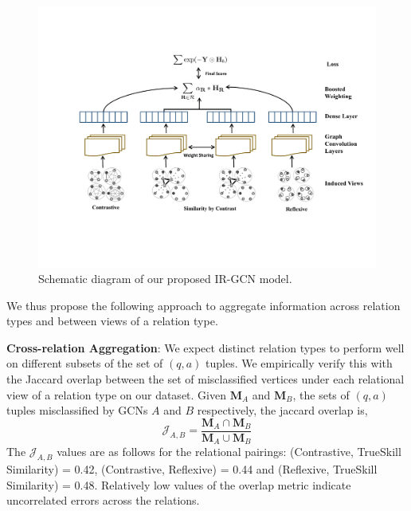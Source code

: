 \begin{figure}
    \centering
    \includegraphics[scale=0.48]{figures/Architecture_new.pdf}
    \caption{\small \label{fig:adaboost} Schematic diagram of our proposed IR-GCN model.} %
    \vspace{-0.1in}
\end{figure}


We thus propose the following approach to aggregate information across relation types and between views of a relation type.

\noindent
\textbf{Cross-relation Aggregation}: We expect distinct relation types to perform well on different subsets of the set of $(q,a)$ tuples. We empirically verify this with the Jaccard overlap between the set of misclassified vertices under each relational view of a relation type on our dataset. Given $\mathbf{M}_A$ and $\mathbf{M}_B$, the sets of $(q,a)$ tuples misclassified by GCNs $A$ and $B$ respectively, the jaccard overlap is,
\begin{equation*}
 \mathcal{J}_{A,B} = \frac{\mathbf{M}_A \cap \mathbf{M}_B}{\mathbf{M}_A \cup \mathbf{M}_B}
\end{equation*}
The $\mathcal{J}_{A,B}$ values are as follows for the relational pairings: (Contrastive, TrueSkill Similarity) = 0.42, (Contrastive, Reflexive) = 0.44 and (Reflexive, TrueSkill Similarity) = 0.48. Relatively low values of the overlap metric indicate uncorrelated errors across the relations.

